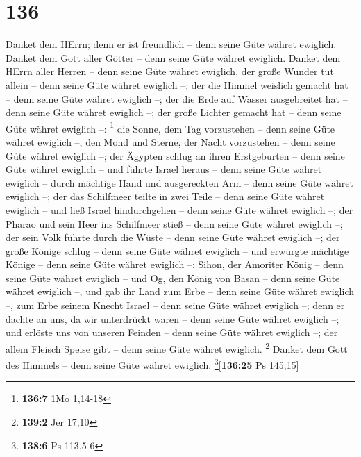 \hypertarget{section-135}{%
\section{136}\label{section-135}}

 Danket dem HErrn; denn er ist freundlich -- denn seine
Güte währet ewiglich.  Danket dem Gott aller Götter --
denn seine Güte währet ewiglich.  Danket dem HErrn aller
Herren -- denn seine Güte währet ewiglich,  der große
Wunder tut allein -- denn seine Güte währet ewiglich --; 
der die Himmel weislich gemacht hat -- denn seine Güte währet ewiglich
--;  der die Erde auf Wasser ausgebreitet hat -- denn
seine Güte währet ewiglich --;  der große Lichter gemacht
hat -- denn seine Güte währet ewiglich --: \footnote{\textbf{136:7} 1Mo
  1,14-18}  die Sonne, dem Tag vorzustehen -- denn seine
Güte währet ewiglich --,  den Mond und Sterne, der Nacht
vorzustehen -- denn seine Güte währet ewiglich --;  der
Ägypten schlug an ihren Erstgeburten -- denn seine Güte währet ewiglich
--  und führte Israel heraus -- denn seine Güte währet
ewiglich --  durch mächtige Hand und ausgereckten Arm --
denn seine Güte währet ewiglich --;  der das Schilfmeer
teilte in zwei Teile -- denn seine Güte währet ewiglich --
 und ließ Israel hindurchgehen -- denn seine Güte währet
ewiglich --;  der Pharao und sein Heer ins Schilfmeer
stieß -- denn seine Güte währet ewiglich --;  der sein
Volk führte durch die Wüste -- denn seine Güte währet ewiglich --;
 der große Könige schlug -- denn seine Güte währet
ewiglich --  und erwürgte mächtige Könige -- denn seine
Güte währet ewiglich --:  Sihon, der Amoriter König --
denn seine Güte währet ewiglich --  und Og, den König von
Basan -- denn seine Güte währet ewiglich --,  und gab ihr
Land zum Erbe -- denn seine Güte währet ewiglich --,  zum
Erbe seinem Knecht Israel -- denn seine Güte währet ewiglich --;
 denn er dachte an uns, da wir unterdrückt waren -- denn
seine Güte währet ewiglich --;  und erlöste uns von
unseren Feinden -- denn seine Güte währet ewiglich --; 
der allem Fleisch Speise gibt -- denn seine Güte währet ewiglich.
\footnote{\textbf{139:2} Jer 17,10}  Danket dem Gott des
Himmels -- denn seine Güte währet ewiglich.
\footnote{\textbf{138:6} Ps 113,5-6}{[}\textbf{136:25} Ps 145,15{]}


